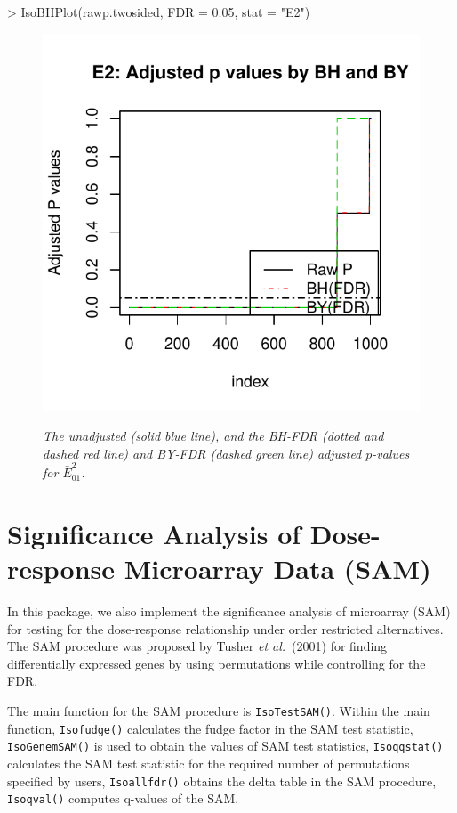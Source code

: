 \documentclass[10pt]{mybook4}
\begin{document}
\begin{Schunk}
\begin{Sinput}
> IsoBHPlot(rawp.twosided, FDR = 0.05, stat = "E2")
\end{Sinput}
\end{Schunk}

\begin{figure}[!h]
\centering
{\includegraphics[width=.6\textwidth]{IsoGene-IsoBHPlot}}
\caption{\em {The unadjusted (solid blue line), and the BH-FDR
(dotted and dashed red line) and BY-FDR (dashed green line) adjusted
$p$-values for $\bar{E}_{01}^2$.}} \label{IsoBHPlot}
\end{figure}



\section{Significance Analysis of Dose-response Microarray Data (SAM)}

In this package, we also implement the significance analysis of microarray (SAM) for testing
for the dose-response relationship under order restricted alternatives. The SAM procedure was proposed
by Tusher \textit{et al.}\ (2001) for finding differentially expressed genes by using permutations while controlling for
the FDR.

The main function for the SAM procedure is \texttt{IsoTestSAM()}. Within the main function, \texttt{Isofudge()}
calculates the fudge factor in the SAM test statistic, \texttt{IsoGenemSAM()} is used
to obtain the values of SAM test statistics, \texttt{Isoqqstat()} calculates the SAM test statistic
for the required number of permutations specified by users, \texttt{Isoallfdr()} obtains the delta table in the SAM procedure,
\texttt{Isoqval()} computes q-values of the SAM.  %
\end{document}
